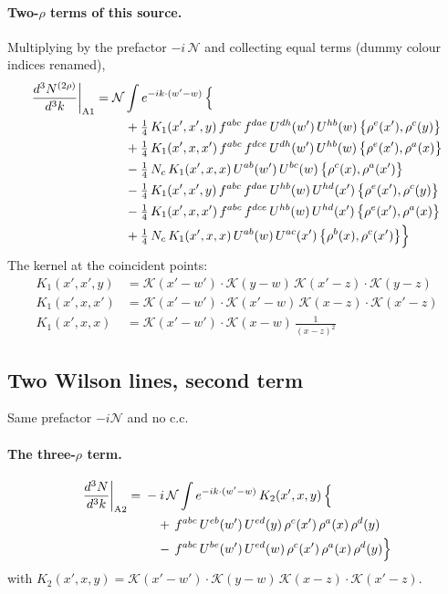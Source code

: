 \documentclass[10pt]{article}
\numberwithin{equation}{section}
\newcommand{\KK}{\mathcal K}
\newcommand{\NN}{\mathcal N}
\begin{document}
\paragraph{Two-$\rho$ terms of this source.} Multiplying by the prefactor $-i\,\NN$ and collecting equal terms (dummy colour indices renamed),
\begin{align}
\frac{d^3N^{(2\rho)}}{d^3k}\bigg|_{\rm A1}={}&\NN\int e^{-ik\cdot(w'-w)}\,\Big\{\notag\\
&\quad +\tfrac14\,K_1(x',x',y)\,f^{abc}\,f^{dae}\,U^{dh}(w')\,U^{hb}(w)\,\big\{\rho^{e}(x'),\rho^{c}(y)\big\}\notag\\
&\quad +\tfrac14\,K_1(x',x,x')\,f^{abc}\,f^{dce}\,U^{dh}(w')\,U^{hb}(w)\,\big\{\rho^{e}(x'),\rho^{a}(x)\big\}\notag\\
&\quad -\tfrac14\,N_{c}\,K_1(x',x,x)\,U^{ab}(w')\,U^{bc}(w)\,\big\{\rho^{c}(x),\rho^{a}(x')\big\}\notag\\
&\quad -\tfrac14\,K_1(x',x',y)\,f^{abc}\,f^{dae}\,U^{hb}(w)\,U^{hd}(x')\,\big\{\rho^{e}(x'),\rho^{c}(y)\big\}\notag\\
&\quad -\tfrac14\,K_1(x',x,x')\,f^{abc}\,f^{dce}\,U^{hb}(w)\,U^{hd}(x')\,\big\{\rho^{e}(x'),\rho^{a}(x)\big\}\notag\\
&\quad +\tfrac14\,N_{c}\,K_1(x',x,x)\,U^{ab}(w)\,U^{ac}(x')\,\big\{\rho^{b}(x),\rho^{c}(x')\big\}\Big\}\label{R:eq:res-A1}
\end{align}
The kernel at the coincident points:
\begin{align*}
K_1(x',x',y)&=\KK(x'-w')\cdot\KK(y-w)\,\KK(x'-z)\cdot\KK(y-z)\\K_1(x',x,x')&=\KK(x'-w')\cdot\KK(x'-w)\,\KK(x-z)\cdot\KK(x'-z)\\K_1(x',x,x)&=\KK(x'-w')\cdot\KK(x-w)\,\frac{1}{(x-z)^2}
\end{align*}
\subsection{Two Wilson lines, second term}\label{R:sec:A2}
Same prefactor $-i\NN$ and no c.c.
\paragraph{The three-$\rho$ term.}
\begin{align}
\frac{d^3N}{d^3k}\bigg|_{\rm A2}={}&-i\,\NN\int e^{-ik\cdot(w'-w)}\,K_2(x',x,y)\,\Big\{\notag\\
&\quad +\,f^{abc}\,U^{eb}(w')\,U^{ed}(y)\,\rho^{c}(x')\,\rho^{a}(x)\,\rho^{d}(y)\notag\\
&\quad -\,f^{abc}\,U^{be}(w')\,U^{ed}(w)\,\rho^{c}(x')\,\rho^{a}(x)\,\rho^{d}(y)\Big\}\label{R:eq:in-A2}
\end{align}
with $K_2(x',x,y)=\KK(x'-w')\cdot\KK(y-w)\,\KK(x-z)\cdot\KK(x'-z)$.
\end{document}
